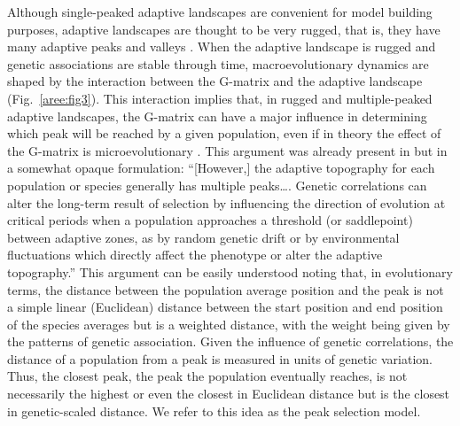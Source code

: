 \begin{refsection}
Although single-peaked adaptive landscapes are convenient for model
building purposes, adaptive landscapes are thought to be very rugged,
that is, they have many adaptive peaks and valleys \parencite{Kauffman1987-ds, Martin2013-ez, Wright1932-ve, Pfaender2016-eb}. When the adaptive
landscape is rugged and genetic associations are stable through time,
macroevolutionary dynamics are shaped by the interaction between the
G-matrix and the adaptive landscape
(Fig.~\ref{aree:fig3}). This interaction implies
that, in rugged and multiple-peaked adaptive landscapes, the G-matrix
can have a major influence in determining which peak will be reached by
a given population, even if in theory the effect of the G-matrix is
microevolutionary \parencite{Steppan2002-be}. This argument was already present in
\textcite[p.~407]{Lande1979-by} but in a somewhat
opaque formulation: ``[However,] the adaptive topography for each
population or species generally has multiple peaks\ldots{}. Genetic
correlations can alter the long-term result of selection by influencing
the direction of evolution at critical periods when a population
approaches a threshold (or saddlepoint) between adaptive zones, as by
random genetic drift or by environmental fluctuations which directly
affect the phenotype or alter the adaptive topography.'' This argument
can be easily understood noting that, in evolutionary terms, the
distance between the population average position and the peak is not a
simple linear (Euclidean) distance between the start position and end
position of the species averages but is a weighted distance, with the
weight being given by the patterns of genetic association. Given the
influence of genetic correlations, the distance of a population from a
peak is measured in units of genetic variation. Thus, the closest peak,
the peak the population eventually reaches, is not necessarily the
highest or even the closest in Euclidean distance but is the closest in
genetic-scaled distance. We refer to this idea as the peak selection
model.


\end{refsection}
